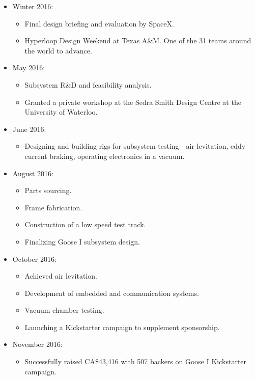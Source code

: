 \documentclass[main.tex]{subfiles}
\begin{document}
\begin{flushleft}
\begin{itemize}
\item Winter 2016:
\begin{itemize}
    \item Final design briefing and evaluation by SpaceX.
    \item Hyperloop Design Weekend at Texas A\&M. One of the 31 teams around the world to advance.
\end{itemize}

\item May 2016:
\begin{itemize}
    \item Subsystem R\&D and feasibility analysis.
    \item Granted a private workshop at the Sedra Smith Design Centre at the University of Waterloo.
\end{itemize}

\item June 2016:
\begin{itemize}
    \item Designing and building rigs for subsystem testing - air levitation, eddy current braking, operating electronics in a vacuum.
\end{itemize}

\item August 2016:
\begin{itemize}
    \item Parts sourcing.
    \item Frame fabrication.
    \item Construction of a low speed test track.
    \item Finalizing Goose I subsystem design.
\end{itemize}

\item October 2016:
\begin{itemize}
    \item Achieved air levitation.
    \item Development of embedded and communication systems.
    \item Vacuum chamber testing.
    \item Launching a Kickstarter campaign to supplement sponsorship.
\end{itemize}

\item November 2016:
\begin{itemize}
    \item Successfully raised CA\$43,416 with 507 backers on Goose I Kickstarter campaign.
\end{itemize}


\end{itemize}
\end{flushleft}
\end{document}
